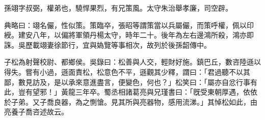 
\begin{pinyinscope}
孫翊字叔弼，權弟也，驍悍果烈，有兄策風。太守朱治舉孝廉，司空辟。

典略曰：翊名儼，性似策。策臨卒，張昭等謂策當以兵屬儼，而策呼權，佩以印綬。建安八年，以偏將軍領丹楊太守，時年二十。後年為左右邊鴻所殺，鴻亦即誅。吳歷載翊妻徐節行，宜與媯覽等事相次，故列於後孫韶傳中。

子松為射聲校尉、都鄉侯。吳錄曰：松善與人交，輕財好施。鎮巴丘，數咨陸遜以得失。嘗有小過，遜面責松，松意色不平，遜觀其少釋，謂曰：「君過聽不以其鄙，數見訪及，是以承來意進盡言，便變色，何也？」松笑曰：「屬亦自忿行事有此，豈有望邪！」黃龍三年卒。蜀丞相諸葛亮與兄瑾書曰：「旣受東朝厚遇，依依於子弟。又子喬良器，為之惻愴。見其所與亮器物，感用流涕。」其悼松如此，由亮養子喬咨述故云。


\end{pinyinscope}